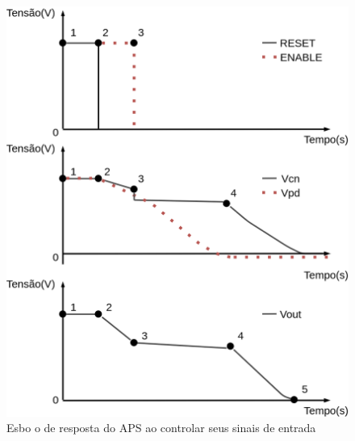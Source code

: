 \begin{figure}[!h]
	\caption{\label{figura_estagiosAPS}Esbo o de resposta do APS ao controlar seus sinais de entrada}
	\begin{center}
	    \includegraphics[scale=0.2]{Imagens/estagiosAPS.png}
	\end{center}
\end{figure}

